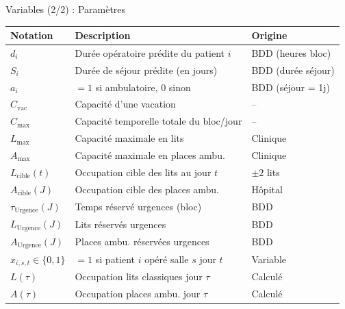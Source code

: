 \documentclass[aspectratio=169,11pt]{beamer}
\begin{document}
\begin{frame}{Variables (2/2) : Paramètres}
  \begin{table}
    \centering
    \scriptsize
    \setlength{\tabcolsep}{4pt}
    \begin{tabular}{lll}
      \toprule
      \textbf{Notation} & \textbf{Description} & \textbf{Origine} \\
      \midrule
      $d_i$ & Durée opératoire prédite du patient $i$ & BDD (heures bloc) \\
      $S_i$ & Durée de séjour prédite (en jours) & BDD (durée séjour) \\
      $a_i$ & $= 1$ si ambulatoire, $0$ sinon & BDD (séjour = 1j) \\
      $C_{\text{vac}}$ & Capacité d'une vacation & -- \\
      $C_{\max}$ & Capacité temporelle totale du bloc/jour & -- \\
      $L_{\max}$ & Capacité maximale en lits & Clinique \\
      $A_{\max}$ & Capacité maximale en places ambu. & Clinique \\
      $L_{\text{cible}}(t)$ & Occupation cible des lits au jour $t$ & $\pm 2$ lits \\
      $A_{\text{cible}}(J)$ & Occupation cible des places ambu. & Hôpital \\
      $\tau_{\text{Urgence}}(J)$ & Temps réservé urgences (bloc) & BDD \\
      $L_{\text{Urgence}}(J)$ & Lits réservés urgences & BDD \\
      $A_{\text{Urgence}}(J)$ & Places ambu. réservées urgences & BDD \\
      \midrule
      $x_{i,s,t} \in \{0,1\}$ & $= 1$ si patient $i$ opéré salle $s$ jour $t$ & Variable \\
      $L(\tau)$ & Occupation lits classiques jour $\tau$ & Calculé \\
      $A(\tau)$ & Occupation places ambu. jour $\tau$ & Calculé \\
      \bottomrule
    \end{tabular}
  \end{table}
\end{frame}
\end{document}
